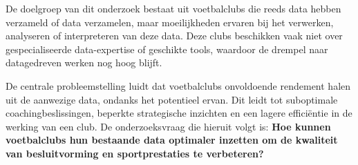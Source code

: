 De doelgroep van dit onderzoek bestaat uit voetbalclubs die reeds data hebben verzameld of data verzamelen, maar moeilijkheden ervaren bij het verwerken, analyseren of interpreteren van deze data.
Deze clubs beschikken vaak niet over gespecialiseerde data-expertise of geschikte tools, waardoor de drempel naar datagedreven werken nog hoog blijft.

De centrale probleemstelling luidt dat voetbalclubs onvoldoende rendement halen uit de aanwezige data, ondanks het potentieel ervan.
Dit leidt tot suboptimale coachingbeslissingen, beperkte strategische inzichten en een lagere efficiëntie in de werking van een club.
De onderzoeksvraag die hieruit volgt is: \textbf{Hoe kunnen voetbalclubs hun bestaande data optimaler inzetten om de kwaliteit van besluitvorming en sportprestaties te verbeteren?}





